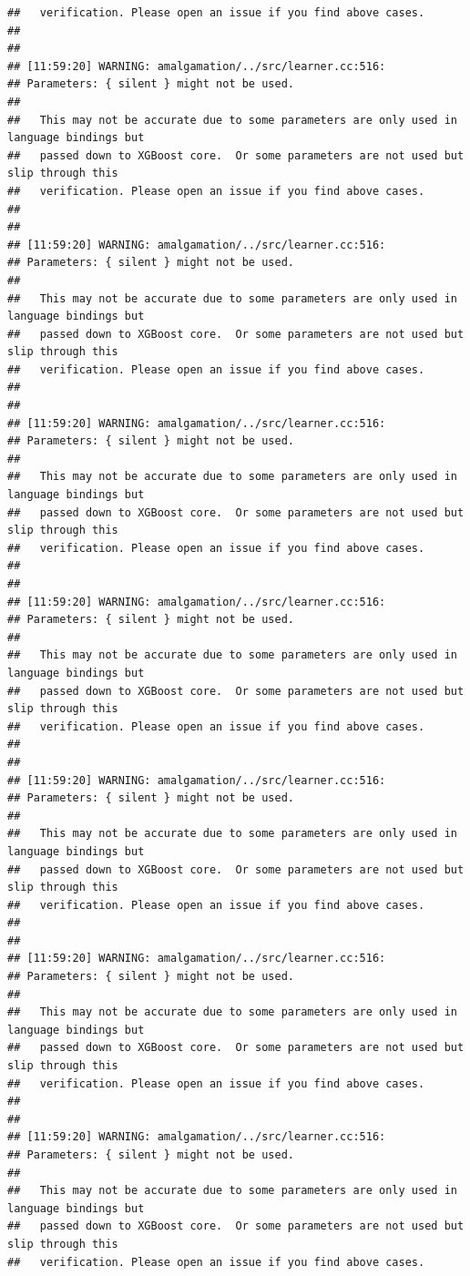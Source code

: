 \documentclass[AMS,STIX2COL]{WileyNJD-v2}\usepackage[]{graphicx}\usepackage[]{color}
\makeatletter
\newenvironment{kframe}{%
 \def\at@end@of@kframe{}%
 \ifinner\ifhmode%
  \def\at@end@of@kframe{\end{minipage}}%
  \begin{minipage}{\columnwidth}%
 \fi\fi%
 \def\FrameCommand##1{\hskip\@totalleftmargin \hskip-\fboxsep
 \colorbox{shadecolor}{##1}\hskip-\fboxsep
     \hskip-\linewidth \hskip-\@totalleftmargin \hskip\columnwidth}%
 \MakeFramed {\advance\hsize-\width
   \@totalleftmargin\z@ \linewidth\hsize
   \@setminipage}}%
 {\par\unskip\endMakeFramed%
 \at@end@of@kframe}
\newenvironment{knitrout}{}{} %
\makeatother
\begin{document}
\begin{knitrout}
\begin{kframe}
\begin{verbatim}
##   verification. Please open an issue if you find above cases.
## 
## 
## [11:59:20] WARNING: amalgamation/../src/learner.cc:516: 
## Parameters: { silent } might not be used.
## 
##   This may not be accurate due to some parameters are only used in language bindings but
##   passed down to XGBoost core.  Or some parameters are not used but slip through this
##   verification. Please open an issue if you find above cases.
## 
## 
## [11:59:20] WARNING: amalgamation/../src/learner.cc:516: 
## Parameters: { silent } might not be used.
## 
##   This may not be accurate due to some parameters are only used in language bindings but
##   passed down to XGBoost core.  Or some parameters are not used but slip through this
##   verification. Please open an issue if you find above cases.
## 
## 
## [11:59:20] WARNING: amalgamation/../src/learner.cc:516: 
## Parameters: { silent } might not be used.
## 
##   This may not be accurate due to some parameters are only used in language bindings but
##   passed down to XGBoost core.  Or some parameters are not used but slip through this
##   verification. Please open an issue if you find above cases.
## 
## 
## [11:59:20] WARNING: amalgamation/../src/learner.cc:516: 
## Parameters: { silent } might not be used.
## 
##   This may not be accurate due to some parameters are only used in language bindings but
##   passed down to XGBoost core.  Or some parameters are not used but slip through this
##   verification. Please open an issue if you find above cases.
## 
## 
## [11:59:20] WARNING: amalgamation/../src/learner.cc:516: 
## Parameters: { silent } might not be used.
## 
##   This may not be accurate due to some parameters are only used in language bindings but
##   passed down to XGBoost core.  Or some parameters are not used but slip through this
##   verification. Please open an issue if you find above cases.
## 
## 
## [11:59:20] WARNING: amalgamation/../src/learner.cc:516: 
## Parameters: { silent } might not be used.
## 
##   This may not be accurate due to some parameters are only used in language bindings but
##   passed down to XGBoost core.  Or some parameters are not used but slip through this
##   verification. Please open an issue if you find above cases.
## 
## 
## [11:59:20] WARNING: amalgamation/../src/learner.cc:516: 
## Parameters: { silent } might not be used.
## 
##   This may not be accurate due to some parameters are only used in language bindings but
##   passed down to XGBoost core.  Or some parameters are not used but slip through this
##   verification. Please open an issue if you find above cases.

\end{verbatim}
\end{kframe}
\end{knitrout}
\end{document}
